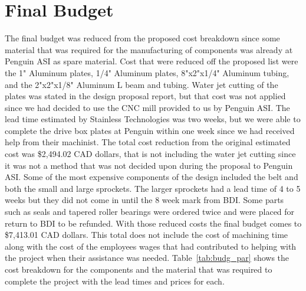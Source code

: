 

\section{Final Budget}
The final budget was reduced from the proposed cost breakdown since some material that was required for the manufacturing of components was already at Penguin ASI as spare material. Cost that were reduced off the proposed list were the 1" Aluminum plates, 1/4" Aluminum plates, 8"x2"x1/4" Aluminum tubing, and the 2"x2"x1/8" Aluminum L beam and tubing. Water jet cutting of the plates was stated in the design proposal report, but that cost was not applied since we had decided to use the CNC mill provided to us by Penguin ASI. The lead time estimated by Stainless Technologies was two weeks, but we were able to complete the drive box plates at Penguin within one week since we had received help from their machinist. The total cost reduction from the original estimated cost was \$2,494.02 CAD dollars, that is not including the water jet cutting since it was not a method that was not decided upon during the proposal to Penguin ASI. Some of the most expensive components of the design included the belt and both the small and large sprockets. The larger sprockets had a lead time of 4 to 5 weeks but they did not come in until the 8 week mark from BDI. Some parts such as seals and tapered roller bearings were ordered twice and were placed for return to BDI to be refunded. With those reduced costs the final budget comes to \$7,413.01 CAD dollars. This total does not include the cost of machining time along with the cost of the employees wages that had contributed to helping with the project when their assistance was needed. Table~\ref{tab:budg_par} shows the cost breakdown for the components and the material that was required to complete the project with the lead times and prices for each.
